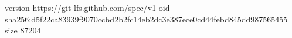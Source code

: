 version https://git-lfs.github.com/spec/v1
oid sha256:d5f22ca83939f9070ccbd2b2fc14eb2dc3e387ece0cd44febd845dd987565455
size 87204
